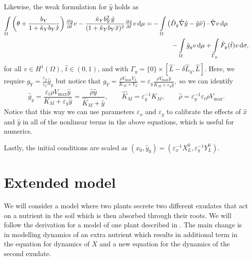 \documentclass[11pt]{article}
\numberwithin{equation}{section}
\begin{document}
Likewise, the weak formulation for \(\hat y\) holds as
\begin{equation}
\label{eq:non-dim-y}
\begin{aligned}
    \int\limits_\Omega
    \left( \theta + \frac{b_Y}{1 + \hat{\kappa}_Y b_Y \hat{x}} \right)  \pd{\hat{y}}{\hat{t}} v 
    -
    \frac{\hat{\kappa}_Y b_Y^2 \hat{y}}{(1+\hat{\kappa}_Y b_Y \hat{x})^2} \pd{\hat x}{\hat t} v
    \dif\mu
    &=
    -\int\limits_\Omega 
    \big(\hat{D}_y \hat{\nabla} \hat{y} - \hat{y}\hat{\nu} \big) \cdot \hat{\nabla} v \dif\mu
    \\
    &\qquad\qquad
    -\int\limits_\Omega \hat{g}_y v \dif\mu
    +\int\limits_{\Gamma_{y}}    \hat{F}_y (\hat t) v    \dif \sigma,
\end{aligned}
\end{equation}
for all \( v\in H^1 (\Omega)\), \(\hat{t}\in (0,1)\), and
with $\Gamma_{y} = \{0\}\times [\hat{L}-\delta \hat{L}_y,\hat{L}]$. Here, we require \( g_Y = \frac{\varepsilon_y}{\varepsilon_t} \hat{g}_y \) but notice that
\(
    g_Y = \frac{\rho V_{\max} Y_L}{K_M + Y_L}
    = \varepsilon_y \frac{\rho V_{\max} \hat{y}}{K_M + \varepsilon_y \hat{y}},
\)
so we can identify 
\[ 
    \hat{g}_y = \frac{ \varepsilon_t \rho V_{\max} \hat{y}}{K_M + \varepsilon_y \hat{y}}
    =
    \frac{ \hat{\rho} \hat{y}}{ \hat{K}_M + \hat{y}},
    \qquad
    \hat{K}_M = \varepsilon_y^{-1} K_M,
    \qquad
    \hat{\rho} = \varepsilon_y^{-1} \varepsilon_t \rho V_{\max}.
\]
Notice that this way we can use parameters \(\varepsilon_x\) and \(\varepsilon_y\) to calibrate the effects of \( \hat{x}\) and \(\hat{y}\) in all of the nonlinear terms in the above equations, which is useful for numerics.

Lastly, the initial conditions are scaled as \( (\hat{x}_0,\hat{y}_0) = (\varepsilon_x^{-1} X^0_L, \varepsilon_y^{-1} Y^0_L) \). 












\section{Extended model}
\label{sec:Extension}

We will consider a model where two plants secrete two different exudates that act on a nutrient in the soil which is then absorbed through their roots. We will follow the derivation for a model of one plant described in \cite{Ptashnyk-2011}. The main change is in modelling dynamics of an extra nutrient which results in additional term in the equation for dynamics of $X$ and a new equation for the dynamics of the second exudate.
	
\end{document}
